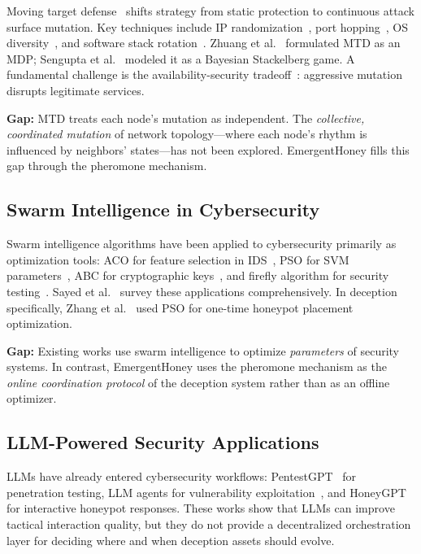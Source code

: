 \documentclass[review,3p,twocolumn]{elsarticle}
\begin{document}
Moving target defense~\cite{jajodia2011mtd} shifts strategy from static protection to continuous attack surface mutation. Key techniques include IP randomization~\cite{jafarian2012openflow}, port hopping~\cite{kewley2001dynamic}, OS diversity~\cite{garcia2014os}, and software stack rotation~\cite{thompson2020software}. Zhuang et al.~\cite{zhuang2014towards} formulated MTD as an MDP; Sengupta et al.~\cite{sengupta2017game} modeled it as a Bayesian Stackelberg game. A fundamental challenge is the availability-security tradeoff~\cite{kc2003countering}: aggressive mutation disrupts legitimate services.

\textbf{Gap:} MTD treats each node's mutation as independent. The \emph{collective, coordinated mutation} of network topology---where each node's rhythm is influenced by neighbors' states---has not been explored. EmergentHoney fills this gap through the pheromone mechanism.

\subsection{Swarm Intelligence in Cybersecurity}

Swarm intelligence algorithms have been applied to cybersecurity primarily as optimization tools: ACO for feature selection in IDS~\cite{chaalal2014aco}, PSO for SVM parameters~\cite{alazzam2020pso}, ABC for cryptographic keys~\cite{elminaam2018abc}, and firefly algorithm for security testing~\cite{khari2019firefly}. Sayed et al.~\cite{sayed2023survey} survey these applications comprehensively. In deception specifically, Zhang et al.~\cite{zhang2019pso} used PSO for one-time honeypot placement optimization.

\textbf{Gap:} Existing works use swarm intelligence to optimize \emph{parameters} of security systems. In contrast, EmergentHoney uses the pheromone mechanism as the \emph{online coordination protocol} of the deception system rather than as an offline optimizer.

\subsection{LLM-Powered Security Applications}

LLMs have already entered cybersecurity workflows: PentestGPT~\cite{deng2024pentestgpt} for penetration testing, LLM agents for vulnerability exploitation~\cite{fang2024llm}, and HoneyGPT~\cite{sun2024honeygpt} for interactive honeypot responses. These works show that LLMs can improve tactical interaction quality, but they do not provide a decentralized orchestration layer for deciding where and when deception assets should evolve.
\end{document}
